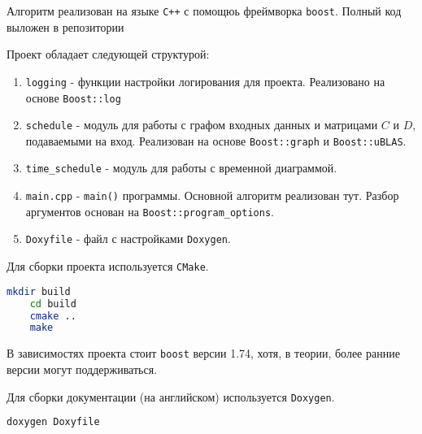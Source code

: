 Алгоритм реализован на языке \lstinline{C++} с помощюь фреймворка \lstinline{boost}. Полный код выложен в репозитории \cite{Repository}

Проект обладает следующей структурой:
\begin{enumerate}
    \item \lstinline{logging} - функции настройки логирования для проекта. Реализовано на основе \lstinline{Boost::log}
    \item \lstinline{schedule} - модуль для работы с графом входных данных и матрицами $C$ и $D$, подаваемыми на вход. Реализован на основе \lstinline{Boost::graph} и \lstinline{Boost::uBLAS}.
    \item \lstinline{time_schedule} - модуль для работы с временной диаграммой. 
    \item \lstinline{main.cpp} - \lstinline{main()} программы. Основной алгоритм реализован тут. Разбор аргументов основан на \lstinline{Boost::program_options}.
    \item \lstinline{Doxyfile} - файл с настройками \lstinline{Doxygen}.
\end{enumerate}

Для сборки проекта используется \lstinline{CMake}.
\begin{lstlisting}[language=bash, caption=Сборка проекта]
    mkdir build
    cd build
    cmake ..
    make
\end{lstlisting}

В зависимостях проекта стоит \lstinline{boost} версии 1.74, хотя, в теории, более ранние версии могут поддерживаться.

Для сборки документации (на английском) используется \lstinline{Doxygen}.
\begin{lstlisting}[language=bash, caption=Сборка документации]
    doxygen Doxyfile
\end{lstlisting}